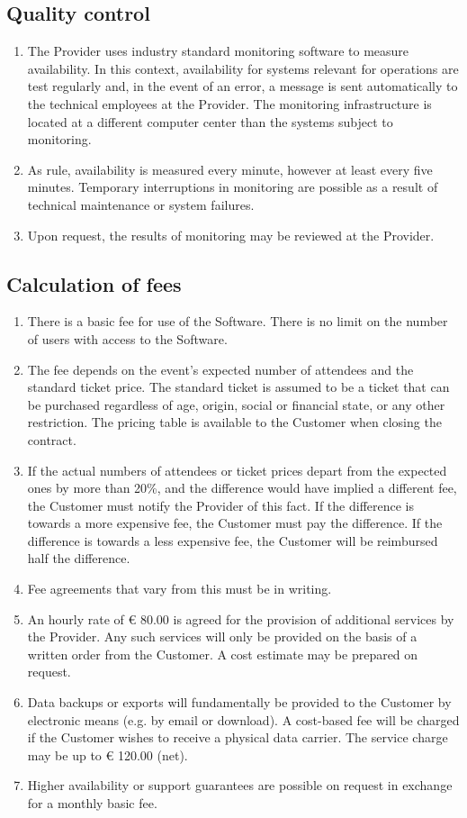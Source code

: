 \documentclass{terms}
\begin{document}
\subsection{Quality control}
\begin{enumerate}
\item The Provider uses industry standard monitoring software to measure availability.
      In this context, availability for systems relevant for operations are test regularly and, in the event of an error, a message is sent automatically to the technical employees at the Provider.
      The monitoring infrastructure is located at a different computer center than the systems subject to monitoring.
\item As rule, availability is measured every minute, however at least every five minutes.
      Temporary interruptions in monitoring are possible as a result of technical maintenance or system failures.
\item Upon request, the results of monitoring may be reviewed at the Provider.
\end{enumerate}

\subsection{Calculation of fees}
\begin{enumerate}
\item There is a basic fee for use of the Software.
      There is no limit on the number of users with access to the Software.
\item The fee depends on the event's expected number of attendees and the standard ticket price.
      The standard ticket is assumed to be a ticket that can be purchased regardless of age, origin, social or financial state, or any other restriction.
      The pricing table is available to the Customer when closing the contract.
\item If the actual numbers of attendees or ticket prices depart from the expected ones by more than 20\%, and the difference would have implied a different fee, the Customer must notify the Provider of this fact.
      If the difference is towards a more expensive fee, the Customer must pay the difference.
      If the difference is towards a less expensive fee, the Customer will be reimbursed half the difference.
\item Fee agreements that vary from this must be in writing.
\item An hourly rate of € 80.00 is agreed for the provision of additional services by the Provider.
      Any such services will only be provided on the basis of a written order from the Customer.
      A cost estimate may be prepared on request.
\item Data backups or exports will fundamentally be provided to the Customer by electronic means (e.g. by email or download).
      A cost-based fee will be charged if the Customer wishes to receive a physical data carrier.
      The service charge may be up to € 120.00 (net).
\item Higher availability or support guarantees are possible on request in exchange for a monthly basic fee.
\end{enumerate}
\end{document}
